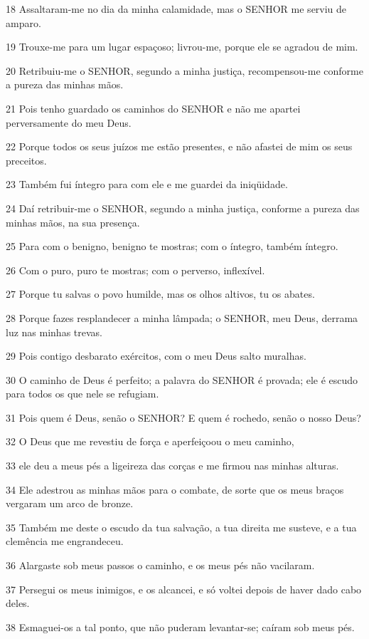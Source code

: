\par 18 Assaltaram-me no dia da minha calamidade, mas o SENHOR me serviu de amparo.
\par 19 Trouxe-me para um lugar espaçoso; livrou-me, porque ele se agradou de mim.
\par 20 Retribuiu-me o SENHOR, segundo a minha justiça, recompensou-me conforme a pureza das minhas mãos.
\par 21 Pois tenho guardado os caminhos do SENHOR e não me apartei perversamente do meu Deus.
\par 22 Porque todos os seus juízos me estão presentes, e não afastei de mim os seus preceitos.
\par 23 Também fui íntegro para com ele e me guardei da iniqüidade.
\par 24 Daí retribuir-me o SENHOR, segundo a minha justiça, conforme a pureza das minhas mãos, na sua presença.
\par 25 Para com o benigno, benigno te mostras; com o íntegro, também íntegro.
\par 26 Com o puro, puro te mostras; com o perverso, inflexível.
\par 27 Porque tu salvas o povo humilde, mas os olhos altivos, tu os abates.
\par 28 Porque fazes resplandecer a minha lâmpada; o SENHOR, meu Deus, derrama luz nas minhas trevas.
\par 29 Pois contigo desbarato exércitos, com o meu Deus salto muralhas.
\par 30 O caminho de Deus é perfeito; a palavra do SENHOR é provada; ele é escudo para todos os que nele se refugiam.
\par 31 Pois quem é Deus, senão o SENHOR? E quem é rochedo, senão o nosso Deus?
\par 32 O Deus que me revestiu de força e aperfeiçoou o meu caminho,
\par 33 ele deu a meus pés a ligeireza das corças e me firmou nas minhas alturas.
\par 34 Ele adestrou as minhas mãos para o combate, de sorte que os meus braços vergaram um arco de bronze.
\par 35 Também me deste o escudo da tua salvação, a tua direita me susteve, e a tua clemência me engrandeceu.
\par 36 Alargaste sob meus passos o caminho, e os meus pés não vacilaram.
\par 37 Persegui os meus inimigos, e os alcancei, e só voltei depois de haver dado cabo deles.
\par 38 Esmaguei-os a tal ponto, que não puderam levantar-se; caíram sob meus pés.
